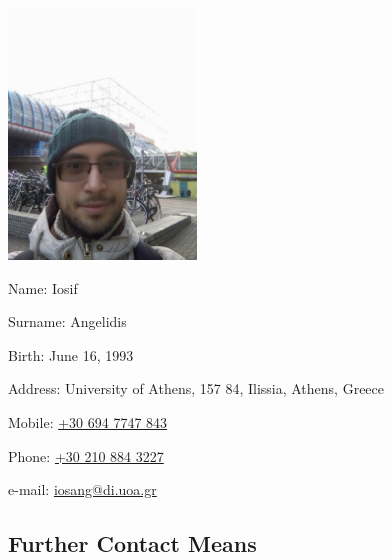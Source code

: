 \documentclass[a4paper,oneside,11pt]{article}
\begin{document}
\begin{multicols}{2} 
\includegraphics[width=5cm]{IMG_20181211_153240.jpg}%
\columnbreak

\begin{flushright}
\textlatin{Name}: \textlatin{Iosif}

\textlatin{Surname}: \textlatin{Angelidis}

\textlatin{Birth}: \textlatin{June 16, 1993}

\textlatin{Address}: \textlatin{University of Athens, 157 84, Ilissia, Athens, Greece}

\textlatin{Mobile}: \textlatin{\href{tel:306947747843}{+30 694 7747 843}}

\textlatin{Phone}: \textlatin{\href{tel:302108843227}{+30 210 884 3227}}

\textlatin{e-mail}: \textlatin{\href{mailto:iosang@di.uoa.gr}{iosang@di.uoa.gr}}

\end{flushright}

\end{multicols}

\subsection*{Further Contact Means}
\end{document}
